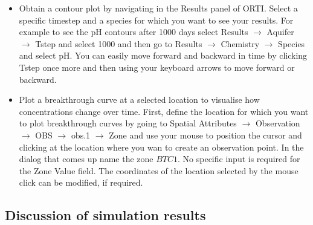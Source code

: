 \begin{itemize}

\item Obtain a contour plot by navigating in the {\color{blue} Results} panel of ORTI.
Select a specific timestep and a species for which you want to see your results.
For example to see the pH contours after 1000 days select {\color{blue}Results} $\rightarrow$ {\color{blue}Aquifer} 
$\rightarrow$ {\color{blue}Tstep} and select {\color{blue}1000} and then go to   
{\color{blue}Results} $\rightarrow$ {\color{blue}Chemistry} 
$\rightarrow$ {\color{blue}Species} and select {\color{blue}pH}.  
You can easily move forward and backward in time by clicking {\color{blue}Tstep} once more and then
using your keyboard arrows to move forward or backward.

\item Plot a breakthrough curve at a selected location to visualise how concentrations change over time.
First, define the location for which you want to plot breakthrough curves by
going to {\color{blue}Spatial Attributes} $\rightarrow$ {\color{blue}Observation} $\rightarrow$ {\color{blue}OBS} $\rightarrow$ {\color{blue}obs.1} $\rightarrow$ {\color{blue}Zone}
and use your mouse to position the cursor and clicking at the location
where you wan to create an observation point. In the dialog that comes up name the zone $BTC1$. 
No specific input is required for the {\color{blue}Zone Value} field.
The coordinates of the location selected by the mouse click can be modified, if required.  
 
\end{itemize}




\subsection[Discussion of simulation results]{Discussion of simulation results}

